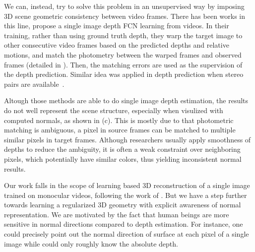 We can, instead, try to solve this problem in an unsupervised way by imposing 3D scene geometric consistency between video frames. There has been works in this line, \cite{zhou2017unsupervised} propose a single image depth FCN learning from videos. In their training, rather than using ground truth depth, they warp the target image to other consecutive video frames based on the predicted depths and relative motions, and match the photometry between the warped frames and observed frames (detailed in ). Then, the matching errors are used as the supervision of the depth prediction. Similar idea was applied in depth prediction when stereo pairs are available~\cite{GargBR16,godard2016unsupervised}.


Altough those methods are able to do single image depth estimation, the results do not well represent the scene structure, especially when visulized with computed normals, as shown in (c).
This is mostly due to that photometric matching is ambiguous, \ie a pixel in source frames can be matched to multiple similar pixels in target frames. Although researchers usually apply smoothness of depths \cite{zhou2017unsupervised} to reduce the ambiguity, it is often a weak constraint over neighboring pixels, which potentially have similar colors, thus yielding inconsistent normal results.


Our work falls in the scope of learning based 3D reconstruction of a single image trained on monocular videos, following the work of \cite{zhou2017unsupervised}. But we have a step further towards learning a regularized 3D geometry with explicit awareness of normal representation.
We are motivated by the fact that human beings are more sensitive in normal directions compared to depth estimation. For instance, one could precisely point out the normal direction of surface at each pixel of a single image while could only roughly know the absolute depth. 


